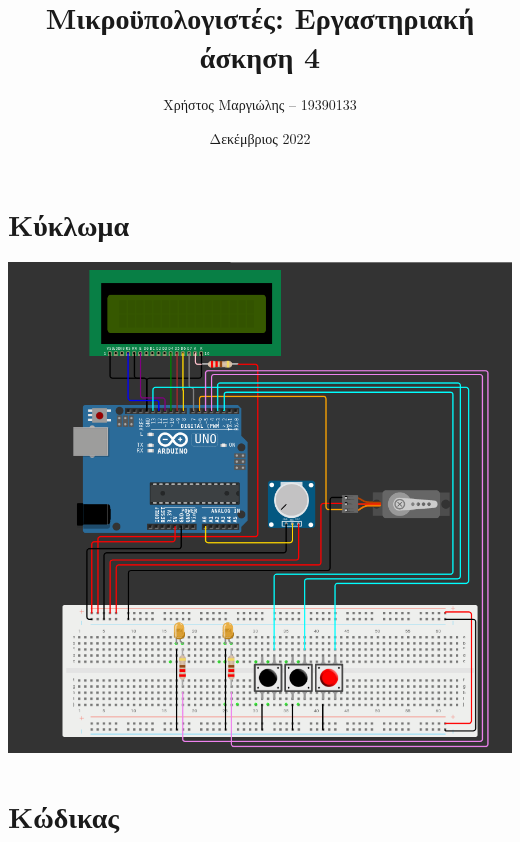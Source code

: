 \documentclass{article}
\title{Μικροϋπολογιστές: Εργαστηριακή άσκηση 4}
\author{Χρήστος Μαργιώλης -- 19390133}
\date{Δεκέμβριος 2022}
\begin{document}
\begin{titlepage}
        \maketitle
\end{titlepage}

\section{Κύκλωμα}

\includegraphics[width=\linewidth]{freertos.png}
\pagebreak

\section{Κώδικας}


\end{document}
